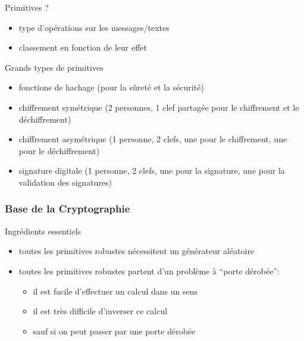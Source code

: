 \begin{reveals}
\begin{frame}
  \vfill

   \begin{block}{Primitives ?}
     \begin{itemize}
     \item type d'opérations sur les messages/textes
     \item classement en fonction  de leur effet
     \end{itemize}
  \end{block}

  \vfill

  \begin{block}{Grands types de primitives}
    \begin{itemize}
    \item fonctions de hachage (pour la sûreté et la sécurité)
    \item chiffrement symétrique (2 personnes, 1 clef partagée pour le chiffrement et le déchiffrement)
    \item chiffrement asymétrique (1 personne, 2 clefs, une pour le
      chiffrement, une pour le déchiffrement)
    \item signature digitale (1 personne, 2 clefs, une pour la
      signature, une pour la validation des signatures)
    \end{itemize}
  \end{block}

  \vfill

\end{frame}

\begin{frame}
  \frametitle{Base de la Cryptographie}

  \vfill

   \begin{block}{Ingrédients essentiels}
     \begin{itemize}
     \item toutes les primitives robustes nécessitent un générateur
       aléatoire
     \item toutes les primitives robustes partent d'un problème à ``porte dérobée'':
       \begin{itemize}
       \item il est facile d'effectuer un calcul dans un sens
       \item il est très difficile d'inverser ce calcul
       \item sauf si on peut passer par une porte dérobée
       \end{itemize}
     \end{itemize}
  \end{block}


\end{frame}
\end{reveals}
